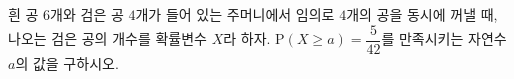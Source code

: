 흰 공 $6$개와 검은 공 $4$개가 들어 있는 주머니에서 임의로 $4$개의 공을 동시에 꺼낼 때, 나오는 검은 공의 개수를 확률변수 $X$라 하자. $\mathrm{P}(X\ge a)=\dfrac{5}{42}$를 만족시키는 자연수 $a$의 값을 구하시오.
